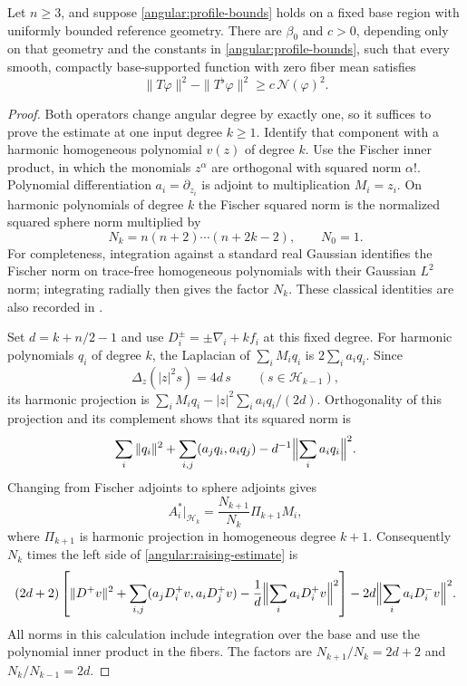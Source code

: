 \begin{lemma}\label{angular:raising}
Let $n\ge3$, and suppose \eqref{angular:profile-bounds} holds on a fixed
base region with uniformly bounded reference geometry.  There are
$\beta_0$ and $c>0$, depending only on that geometry and the constants in
\eqref{angular:profile-bounds}, such that every smooth, compactly
base-supported function with zero fiber mean satisfies
\begin{equation}\label{angular:raising-estimate}
 \|T\varphi\|^2-\|T^\flat\varphi\|^2
       \ge c\,\mathcal N(\varphi)^2.
\end{equation}
\end{lemma}

\begin{proof}
Both operators change angular degree by exactly one, so it suffices to
prove the estimate at one input degree $k\ge1$.  Identify that component
with a harmonic homogeneous polynomial $v(z)$ of degree $k$.  Use the
Fischer inner product, in which the monomials $z^\alpha$ are orthogonal
with squared norm $\alpha!$.  Polynomial differentiation $a_i=\partial_{z_i}$
is adjoint to multiplication $M_i=z_i$.  On harmonic polynomials of degree
$k$ the Fischer squared norm is the normalized squared sphere norm
multiplied by
\[
 N_k=n(n+2)\cdots(n+2k-2),\qquad N_0=1.
\]
For completeness, integration against a standard real Gaussian identifies
the Fischer norm on trace-free homogeneous polynomials with their
Gaussian $L^2$ norm;
integrating radially then gives the factor $N_k$.  These classical
identities are also recorded in \cite[Equation~(2.1) and
Theorem~2.1]{Render08}.

Set $d=k+n/2-1$ and use $D_i^\pm=\pm\nabla_i+k f_i$ at this fixed degree.
For harmonic polynomials $q_i$ of degree $k$, the Laplacian of
$\sum_iM_iq_i$ is $2\sum_i a_iq_i$.  Since
\[
 \Delta_z(|z|^2s)=4d\,s\qquad(s\in\mathcal H_{k-1}),
\]
its harmonic projection is
$\sum_iM_iq_i-|z|^2\sum_i a_iq_i/(2d)$.  Orthogonality of this projection
and its complement shows that its squared norm is
\[
 \sum_i\|q_i\|^2+\sum_{i,j}(a_jq_i,a_iq_j)
             -d^{-1}\Bigl\|\sum_i a_iq_i\Bigr\|^2.
\]
Changing from Fischer adjoints to sphere adjoints gives
\[
 A_i^*|_{\mathcal H_k}
   =\frac{N_{k+1}}{N_k}\Pi_{k+1}M_i,
\]
where $\Pi_{k+1}$ is harmonic projection in homogeneous degree $k+1$.
Consequently $N_k$ times the left side of
\eqref{angular:raising-estimate} is
\begin{equation}\label{angular:Fock-difference}
 \begin{split}
 (2d+2)\left[\|D^+v\|^2
   +\sum_{i,j}(a_jD_i^+v,a_iD_j^+v)
   -\frac1d\Bigl\|\sum_i a_iD_i^+v\Bigr\|^2\right]
 -2d\Bigl\|\sum_i a_iD_i^-v\Bigr\|^2.
 \end{split}
\end{equation}
All norms in this calculation include integration over the base and use
the polynomial inner product in the fibers.  The factors are
$N_{k+1}/N_k=2d+2$ and $N_k/N_{k-1}=2d$.


\end{proof}

